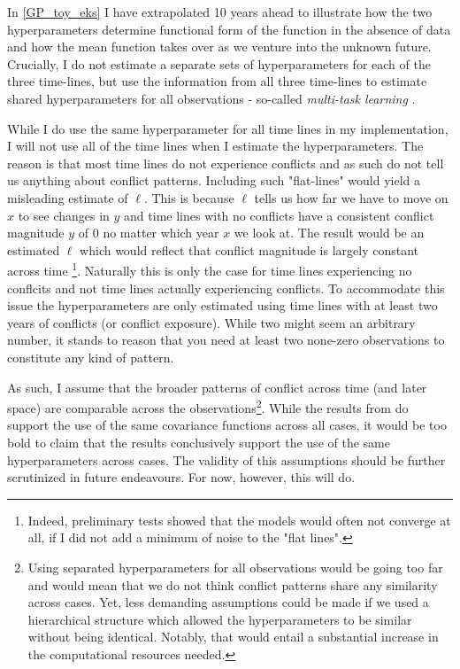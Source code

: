 \documentclass[a4paper]{article}
\begin{document}
In \autoref{GP_toy_eks} I have extrapolated 10 years ahead to illustrate how the two hyperparameters determine functional form of the function in the absence of data and how the mean function takes over as we venture into the unknown future. Crucially, I do not estimate a separate sets of hyperparameters for each of the three time-lines, but use the information from all three time-lines to estimate shared hyperparameters for all observations - so-called \emph{multi-task learning} \cite[115]{williams2006gaussian}.\par

%

While I do use the same hyperparameter for all time lines in my implementation, I will not use all of the time lines when I estimate the hyperparameters. The reason is that most time lines do not experience conflicts and as such do not tell us anything about conflict patterns. Including such "flat-lines" would yield a misleading estimate of $\ell$. This is because $\ell$ tells us how far we have to move on $x$ to see changes in $y$ and time lines with no conflicts have a consistent conflict magnitude $y$ of $0$ no matter which year $x$ we look at. The result would be an estimated $\ell$ which would reflect that conflict magnitude is largely constant across time \footnote{Indeed, preliminary tests showed that the models would often not converge at all, if I did not add a minimum of noise to the "flat lines".}. Naturally this is only the case for time lines experiencing no conflcits and not time lines actually experiencing conflicts. To accommodate this issue the hyperparameters are only estimated using time lines with at least two years of conflicts (or conflict exposure). While two might seem an arbitrary number, it stands to reason that you need at least two none-zero observations to constitute any kind of pattern.\par

As such, I assume that the broader patterns of conflict across time (and later space) are comparable across the observations\footnote{Using separated hyperparameters for all observations would be going too far and would mean that we do not think conflict patterns share any similarity across cases. Yet, less demanding assumptions could be made if we used a hierarchical structure which allowed the hyperparameters to be similar without being identical. Notably, that would entail a substantial increase in the computational resources needed.}. While the results from \cite{schutte2011diffusion} do support the use of the same covariance functions across all cases, it would be too bold to claim that the results conclusively support the use of the same hyperparameters across cases. The validity of this assumptions should be further scrutinized in future endeavours. For now, however, this will do.\par
\end{document}
